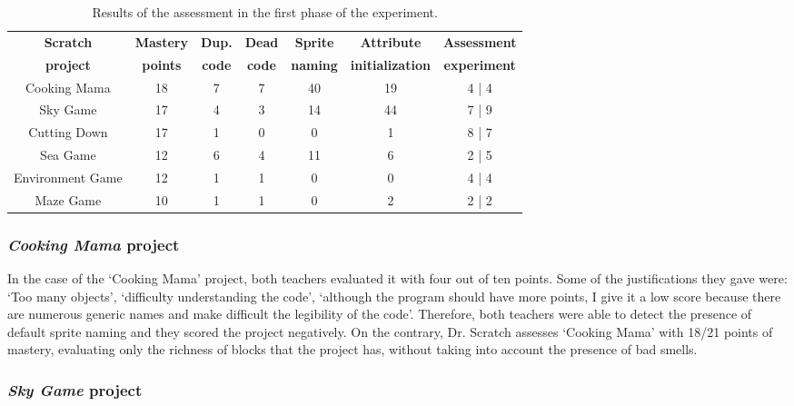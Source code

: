 \begin{table}
    \centering
    \begin{tabular}{|c|c|c|c|c|c|c|}
        \hline
        \textbf{Scratch} & \textbf{Mastery} & \textbf{Dup.} & \textbf{Dead} & \textbf{Sprite} & \textbf{Attribute} & \textbf{Assessment} \\ 
        \textbf{project} & \textbf{points} & \textbf{code} & \textbf{code} & \textbf{naming} & \textbf{initialization} & \textbf{experiment} \\ \hline
        Cooking Mama & 18 & 7 & 7 & 40 & 19 & 4 | 4 \\ \hline
        Sky Game & 17 & 4 & 3 & 14 & 44 & 7 | 9 \\ \hline
        Cutting Down & 17 & 1 & 0 & 0 & 1 & 8 | 7 \\ \hline
        Sea Game & 12 & 6 & 4 & 11 & 6 & 2 | 5 \\ \hline
        Environment Game & 12 & 1 & 1 & 0 & 0 & 4 | 4 \\ \hline
        Maze Game & 10 & 1 & 1 & 0 & 2 & 2 | 2 \\ \hline
    \end{tabular}
    \caption{Results of the assessment in the first phase of the experiment.}
    \label{table:assessment_experiment_results_1}
\end{table}

\subsubsection{\textit{Cooking Mama} project}
\label{subsub:cooking_mama}

In the case of the `Cooking Mama' project, both teachers evaluated it with four out of ten points. Some of the justifications they gave were: `Too many objects', `difficulty understanding the code', `although the program should have more points, I give it a low score because there are numerous generic names and make difficult the legibility of the code'. Therefore, both teachers were able to detect the presence of default sprite naming and they scored the project negatively. On the contrary, Dr. Scratch assesses `Cooking Mama' with 18/21 points of mastery, evaluating only the richness of blocks that the project has, without taking into account the presence of bad smells.

\subsubsection{\textit{Sky Game} project}
\label{subsub:sky_game}

